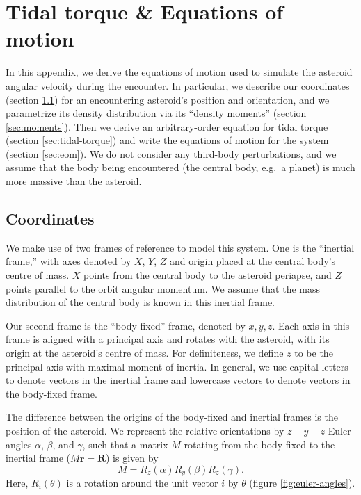 


\appendix

\section{Tidal torque \& Equations of motion}
\label{app:eom}

In this appendix, we derive the equations of motion used to simulate the asteroid angular velocity during the encounter. In particular, we describe our coordinates (section \ref{sec:coordinates}) for an encountering asteroid's position and orientation, and we parametrize its density distribution via its ``density moments'' (section \ref{sec:moments}). Then we derive an arbitrary-order equation for tidal torque (section \ref{sec:tidal-torque}) and write the equations of motion for the system (section \ref{sec:eom}). We do not consider any third-body perturbations, and we assume that the body being encountered (the central body, e.g.~a planet) is much more massive than the asteroid.

\subsection{Coordinates}
\label{sec:coordinates}

We make use of two frames of reference to model this system. One is the ``inertial frame,'' with axes denoted by $\unit{X}$, $\unit{Y}$, $\unit{Z}$ and origin placed at the central body's centre of mass. $\unit{X}$ points from the central body to the asteroid periapse, and $\unit{Z}$ points parallel to the orbit angular momentum. We assume that the mass distribution of the central body is known in this inertial frame.

Our second frame is the ``body-fixed'' frame, denoted by $\unit{x}, \unit{y}, \unit{z}$. Each axis in this frame is aligned with a principal axis and rotates with the asteroid, with its origin at the asteroid's centre of mass. For definiteness, we define $\unit{z}$ to be the principal axis with maximal moment of inertia. In general, we use capital letters to denote vectors in the inertial frame and lowercase vectors to denote vectors in the body-fixed frame.

The difference between the origins of the body-fixed and inertial frames is the position of the asteroid. We represent the relative orientations by $z-y-z$ Euler angles $\alpha$, $\beta$, and $\gamma$, such that a matrix $M$ rotating from the body-fixed to the inertial frame ($M\bm{r} = \bm{R}$) is given by
\begin{equation}
M = R_z(\alpha) R_y(\beta) R_z(\gamma).
\label{eqn:euler-angles}
\end{equation}
Here, $R_i(\theta)$ is a rotation around the unit vector $i$ by $\theta$ (figure \ref{fig:euler-angles}).

